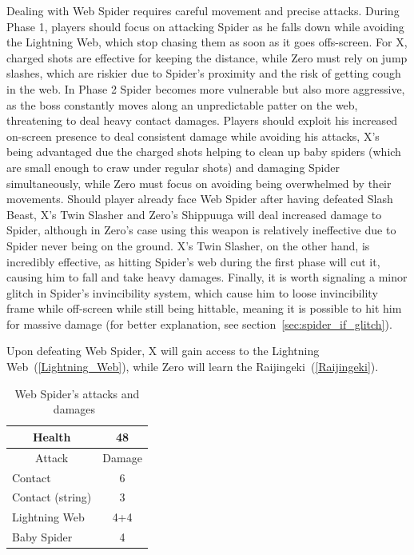 Dealing with Web Spider requires careful movement and precise attacks. During Phase 1, players should focus on attacking Spider as he falls down while avoiding the Lightning Web, which stop chasing them as soon as it goes offs-screen. For X, charged shots are effective for keeping the distance, while Zero must rely on jump slashes, which are riskier due to Spider's proximity and the risk of getting cough in the web. In Phase 2 Spider becomes more vulnerable but also more aggressive, as the boss constantly moves along an unpredictable patter on the web, threatening to deal heavy contact damages. Players should exploit his increased on-screen presence to deal consistent damage while avoiding his attacks, X's being advantaged due the charged shots helping to clean up baby spiders (which are small enough to craw under regular shots) and damaging Spider simultaneously, while Zero must focus on avoiding being overwhelmed by their movements. Should player already face Web Spider after having defeated Slash Beast, X's Twin Slasher and Zero's Shippuuga will deal increased damage to Spider, although in Zero's case using this weapon is relatively ineffective due to Spider never being on the ground. X's Twin Slasher, on the other hand, is incredibly effective, as hitting Spider's web during the first phase will cut it, causing him to fall and take heavy damages. Finally, it is worth signaling a minor glitch in Spider's invincibility system, which cause him to loose invincibility frame while off-screen while still being hittable, meaning it is possible to hit him for massive damage (for better explanation, see section~\ref{sec:spider_if_glitch}).

Upon defeating Web Spider, X will gain access to the Lightning Web~(\ref{Lightning_Web}), while Zero will learn the Raijingeki~(\ref{Raijingeki}).

\begin{table}[htp]
	\centering
	\begin{tabular}[h]{l c}
		\toprule
		\multicolumn{1}{c}{Health}  & 48\\
		\midrule
		\multicolumn{1}{c}{Attack} & \multicolumn{1}{c}{Damage}\\
		Contact & 6 \\
		Contact (string)& 3 \\
		Lightning Web & 4+4 \\
		Baby Spider& 4\\
		\bottomrule
	\end{tabular}
	\caption{Web Spider's attacks and damages~\cite{book:Compendium,wiki:Web_spider}}
\end{table}


